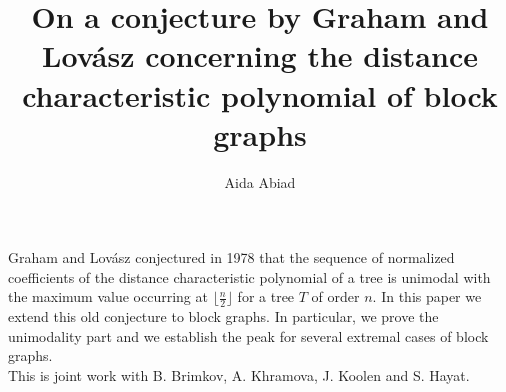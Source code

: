 \documentclass[a4paper]{amsart}
\date{}
\begin{document}
\title{On a conjecture by Graham and Lov\'{a}sz concerning the distance characteristic polynomial of block graphs}
\author{Aida Abiad} %
\address{Eindhoven University of Technology, Ghent University, Vrije universiteit Brussel} %

\maketitle


Graham and Lov\'{a}sz conjectured in 1978 that the sequence of normalized coefficients of the distance characteristic polynomial of a tree is unimodal with the maximum value occurring at $\lfloor\frac{n}{2}\rfloor$ for a tree $T$ of order $n$. In this paper we extend this old conjecture to block graphs. In particular, we prove the unimodality part and we establish the peak for several extremal cases of block graphs.  \\
This is joint work with B. Brimkov, A. Khramova, J. Koolen and S. Hayat.
\end{document}
